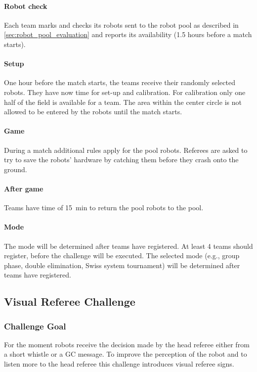             \paragraph{Robot check} Each team marks and checks its robots sent to the robot pool as described in \cref{sec:robot_pool_evaluation} and reports its availability (1.5 hours before a match starts).
            \paragraph{Setup} One hour before the match starts, the teams receive their randomly selected robots. They have now time for set-up and calibration. For calibration only one half of the field is available for a team. The area within the center circle is not allowed to be entered by the robots until the match starts.
            \paragraph{Game} During a match additional rules apply for the pool robots. Referees are asked to try to save the robots' hardware by catching them before they crash onto the ground.
            \paragraph{After game} Teams have time of \qty{15}{\minute} to return the pool robots to the pool.

        \paragraph{Mode}
            The mode will be determined after teams have registered. At least 4 teams should register, before the challenge will be executed. The selected mode (e.g., group phase, double elimination, Swiss system tournament) will be determined after teams have registered.

\subsection{Visual Referee Challenge}

    \subsubsection{Challenge Goal}

        For the moment robots receive the decision made by the head referee either from a short whistle or a GC message. To improve the perception of the robot and to listen more to the head referee this challenge introduces visual referee signs.

